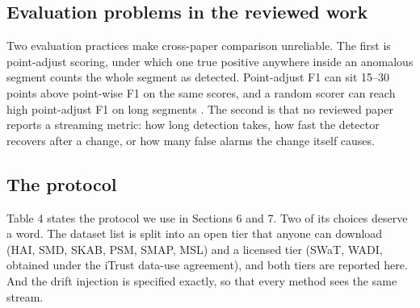 \hypertarget{evaluation-problems-in-the-reviewed-work}{%
\subsection{Evaluation problems in the reviewed work}\label{evaluation-problems-in-the-reviewed-work}}

Two evaluation practices make cross-paper comparison unreliable. The first is point-adjust scoring, under which one true positive anywhere inside an anomalous segment counts the whole segment as detected. Point-adjust F1 can sit 15--30 points above point-wise F1 on the same scores, and a random scorer can reach high point-adjust F1 on long segments \citep{kim2022rigorous, garg2022evaluation, wu2023flawed}. The second is that no reviewed paper reports a streaming metric: how long detection takes, how fast the detector recovers after a change, or how many false alarms the change itself causes.

\hypertarget{the-protocol}{%
\subsection{The protocol}\label{the-protocol}}

Table 4 states the protocol we use in Sections 6 and 7. Two of its choices deserve a word. The dataset list is split into an open tier that anyone can download (HAI, SMD, SKAB, PSM, SMAP, MSL) and a licensed tier (SWaT, WADI, obtained under the iTrust data-use agreement), and both tiers are reported here. And the drift injection is specified exactly, so that every method sees the same stream.

